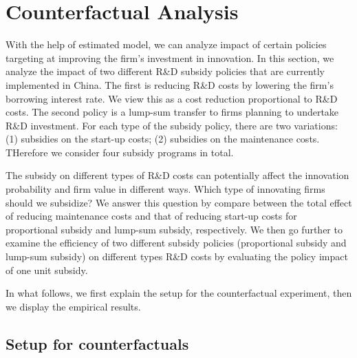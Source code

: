\documentclass[11pt]{article}
\begin{document}
\section{Counterfactual Analysis}
With the help of estimated model, we can analyze impact of certain policies targeting at improving the firm's investment in innovation. In this section, we analyze the impact of two different R\&D subsidy policies that are currently implemented in China. The first is reducing R\&D costs by lowering the firm's borrowing interest rate. We view this as a cost reduction proportional to R\&D costs. The second policy is a lump-sum transfer to firms planning to undertake R\&D investment. For each type of the subsidy policy, there are two variations: (1) subsidies on the start-up costs; (2) subsidies on the maintenance costs. THerefore we consider four subsidy programs in total. 

The subsidy on different types of R\&D costs can potentially affect the innovation probability and firm value in different ways. Which type of innovating firms should we subsidize? We answer this question by compare between the total effect of reducing maintenance costs and that of reducing start-up costs for proportional subsidy and lump-sum subsidy, respectively. We then go further to examine the efficiency of two different subsidy policies (proportional subsidy and lump-sum subsidy) on different types R\&D costs by evaluating the policy impact of one unit subsidy.  

In what follows, we first explain the setup for the counterfactual experiment, then we display the empirical results. 

\subsection{Setup for counterfactuals} 
\end{document}
